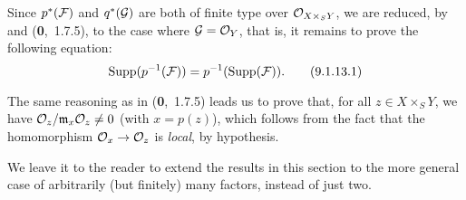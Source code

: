 \documentclass[../main.tex]{subfiles}
\begin{document}
Since $p^\ast(\mathcal{F})$ and $q^\ast(\mathcal{G})$ are both of finite type over $\mathcal{O}_{X\times_S Y}$, we are reduced, by  and (\textbf{0},~1.7.5), to the case where $\mathcal{G}=\mathcal{O}_Y$, that is, it remains to prove the following equation:
\[
  \operatorname{Supp}(p^{-1}(\mathcal{F})) = p^{-1}(\operatorname{Supp}(\mathcal{F})).\tag{9.1.13.1}
\]

The same reasoning as in (\textbf{0},~1.7.5) leads us to prove that, for all $z\in X\times_S Y$, we have $\mathcal{O}_z/\mathfrak{m}_x\mathcal{O}_z\neq0$ (with $x=p(z)$), which follows from the fact that the homomorphism $\mathcal{O}_x\to\mathcal{O}_z$ is \emph{local}, by hypothesis.

We leave it to the reader to extend the results in this section to the more general case of arbitrarily (but finitely) many factors, instead of just two.
\end{document}
